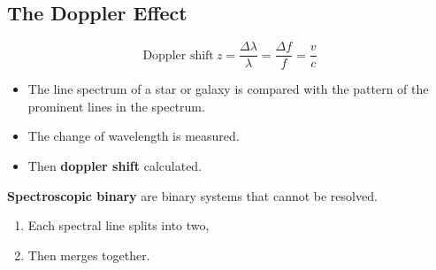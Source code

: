 \subsection{The Doppler Effect}

$$\text{Doppler shift}\ z=\frac{\Delta\lambda}{\lambda}=\frac{\Delta f}{f}=\frac{v}{c}$$

\begin{itemize}
    \item The line spectrum of a star or galaxy is compared with the pattern of the prominent lines in the spectrum.
    \item The change of wavelength is measured.
    \item Then \textbf{doppler shift} calculated.
\end{itemize}

\textbf{Spectroscopic binary} are binary systems that cannot be resolved.
\begin{enumerate}
    \item Each spectral line splits into two,
    \item Then merges together.
\end{enumerate}
